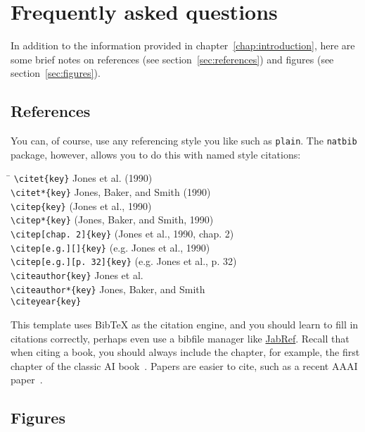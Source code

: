 \chapter{Frequently asked questions\label{chap:faq}}

In addition to the information provided in
chapter~\ref{chap:introduction}, here are some brief notes on
references (see section~\ref{sec:references}) and figures (see
section~\ref{sec:figures}).

\section{References\label{sec:references}}

You can, of course, use any referencing style you like such as
\verb+plain+.  The \verb+natbib+ package, however, allows you to do
this with named style citations:

\begin{tabbing}
\hspace{3in} \= \kill
\verb-\citet{key}- \> Jones et al. (1990) \\
\verb-\citet*{key}- \> Jones, Baker, and Smith (1990) \\
\verb-\citep{key}- \> (Jones et al., 1990) \\
\verb-\citep*{key}- \> (Jones, Baker, and Smith, 1990) \\
\verb-\citep[chap. 2]{key}- \> (Jones et al., 1990, chap. 2) \\
\verb-\citep[e.g.][]{key}- \> (e.g. Jones et al., 1990) \\
\verb-\citep[e.g.][p. 32]{key}- \> (e.g. Jones et al., p. 32) \\
\verb-\citeauthor{key}- \> Jones et al. \\
\verb-\citeauthor*{key}- \> Jones, Baker, and Smith \\
\verb-\citeyear{key}-  \\
\end{tabbing}

This template uses BibTeX as the citation engine, and you should learn to fill in citations correctly, perhaps even use a bibfile manager like \href{https://www.jabref.org}{JabRef}. 
Recall that when citing a book, you should always include the chapter, for example, the first chapter of the classic AI book~\cite[Ch. 1]{RussellNorvig2022}. 
Papers are easier to cite, such as a recent AAAI paper~\cite{Amado2022}. 

\section{Figures\label{sec:figures}}

